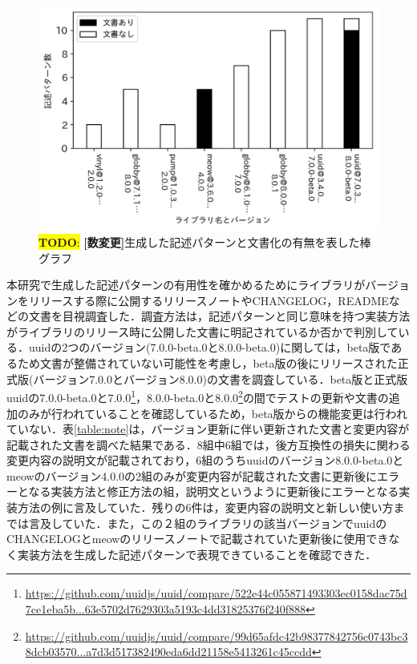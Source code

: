 \documentclass[11pt]{jreport}
\newcommand{\todo}[1]{\colorbox{yellow}{{\bf TODO}:}{\color{red} {\textbf{[#1]}}}}
\begin{document}
\begin{figure}[t]
\centerline{\includegraphics[width=0.9\linewidth]{@BSthesis2024_Iida/BSthesis2024_Iida_fig/RQ1_bar_graph.pdf}}
\caption{\todo{数変更}生成した記述パターンと文書化の有無を表した棒グラフ}
\label{fig:bar_plot}
\end{figure}

本研究で生成した記述パターンの有用性を確かめるためにライブラリがバージョンをリリースする際に公開するリリースノートやCHANGELOG，READMEなどの文書を目視調査した．調査方法は，記述パターンと同じ意味を持つ実装方法がライブラリのリリース時に公開した文書に明記されているか否かで判別している．uuidの2つのバージョン(7.0.0-beta.0と8.0.0-beta.0)に関しては，beta版であるため文書が整備されていない可能性を考慮し，beta版の後にリリースされた正式版(バージョン7.0.0とバージョン8.0.0)の文書を調査している．beta版と正式版uuidの7.0.0-beta.0と7.0.0\footnote{\url{https://github.com/uuidjs/uuid/compare/522e44c055871493303ec0158dac75d7ce1eba5b...63e5702d7629303a5193c4dd31825376f240f888}}，8.0.0-beta.0と8.0.0\footnote{\url{https://github.com/uuidjs/uuid/compare/99d65afdc42b98377842756c0743bc38dcb03570...a7d3d517382490eda6dd21158e5413261c45ccdd}}の間でテストの更新や文書の追加のみが行われていることを確認しているため，beta版からの機能変更は行われていない．表\ref{table:note}は，バージョン更新に伴い更新された文書と変更内容が記載された文書を調べた結果である．8組中6組では，後方互換性の損失に関わる変更内容の説明文が記載されており，6組のうちuuidのバージョン8.0.0-beta.0とmeowのバージョン4.0.0の2組のみが変更内容が記載された文書に更新後にエラーとなる実装方法と修正方法の組，説明文というように更新後にエラーとなる実装方法の例に言及していた．残りの6件は，変更内容の説明文と新しい使い方までは言及していた．また，この２組のライブラリの該当バージョンでuuidのCHANGELOGとmeowのリリースノートで記載されていた更新後に使用できなく実装方法を生成した記述パターンで表現できていることを確認できた．
\end{document}
